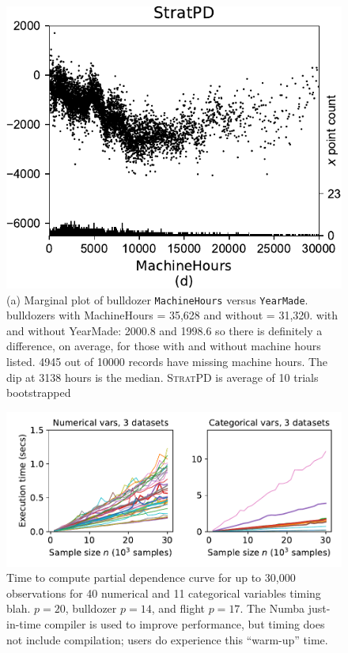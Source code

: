 \documentclass[smallextended]{svjour3}       %
\newcommand{\spd}{\fontfamily{cmr}\textsc{\small StratPD}}
\begin{document}
{\begin{figure}[!htbp]
\begin{center}
\includegraphics[scale=0.35]{images/bulldozer_MachineHours_stratpd.pdf}
\caption{\small (a) Marginal plot of bulldozer {\tt MachineHours} versus {\tt YearMade}.  bulldozers with MachineHours = 35,628 and without = 31,320. with and without YearMade: 2000.8 and 1998.6 so there is definitely a difference, on average, for those with and without machine hours listed. 4945 out of 10000 records have missing machine hours.  The dip at 3138 hours is the median. \spd{} is average of 10 trials bootstrapped}
\label{fig:machinehours}
\end{center}
\end{figure}
}

\begin{figure}[!htbp]
\begin{center}
\includegraphics[scale=.4]{images/timing.pdf}\vspace{-3mm}
\caption{\small Time to compute partial dependence curve for up to 30,000 observations for 40 numerical and 11 categorical variables timing blah. $p=20$, bulldozer $p=14$, and flight $p=17$. The Numba just-in-time compiler is used to improve performance, but timing does not include compilation; users do experience this ``warm-up'' time.}
\label{fig:timing}
\end{center}
\end{figure}
\end{document}
